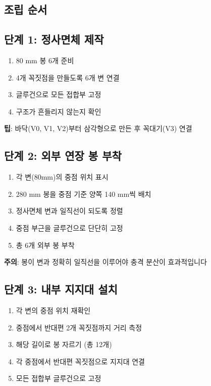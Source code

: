 \documentclass[a4paper,12pt]{article}
\begin{document}
\begin{CJK}{UTF8}{mj}
\section{조립 순서}

\subsection{단계 1: 정사면체 제작}

\begin{enumerate}
    \item 80 mm 봉 6개 준비
    \item 4개 꼭짓점을 만들도록 6개 변 연결
    \item 글루건으로 모든 접합부 고정
    \item 구조가 흔들리지 않는지 확인
\end{enumerate}

\textbf{팁}: 바닥(V0, V1, V2)부터 삼각형으로 만든 후 꼭대기(V3) 연결

\subsection{단계 2: 외부 연장 봉 부착}

\begin{enumerate}
    \item 각 변(80mm)의 중점 위치 표시
    \item 280 mm 봉을 중점 기준 양쪽 140 mm씩 배치
    \item 정사면체 변과 일직선이 되도록 정렬
    \item 중점 부근을 글루건으로 단단히 고정
    \item 총 6개 외부 봉 부착
\end{enumerate}

\textbf{주의}: 봉이 변과 정확히 일직선을 이루어야 충격 분산이 효과적입니다

\subsection{단계 3: 내부 지지대 설치}

\begin{enumerate}
    \item 각 변의 중점 위치 재확인
    \item 중점에서 반대편 2개 꼭짓점까지 거리 측정
    \item 해당 길이로 봉 자르기 (총 12개)
    \item 각 중점에서 반대편 꼭짓점으로 지지대 연결
    \item 모든 접합부 글루건으로 고정
\end{enumerate}


\end{CJK}
\end{document}
